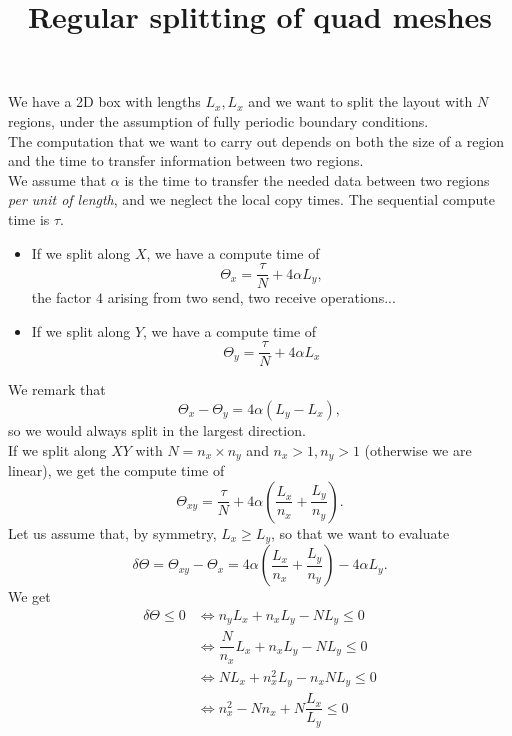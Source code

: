 \documentclass[aps]{revtex4}
\begin{document}
\title{Regular splitting of quad meshes}
\maketitle
We have a 2D box with lengths $L_x,L_x$ and
we want to split the layout with $N$ regions, under the assumption
of fully periodic boundary conditions.\\
 The computation
that we want to carry out depends on both the size of
a region and the time to transfer information between two
regions.\\
We assume that $\alpha$ is the time to transfer the needed data 
between two regions \emph{per unit of length}, and
we neglect the local copy times.
The sequential compute time is $\tau$.
\begin{itemize}
\item If we split along $X$, we have a compute time of
\begin{equation}
	\Theta_x = \dfrac{\tau}{N} + 4\alpha L_y,
\end{equation}
the factor $4$ arising from two send, two receive operations...

\item If we split along $Y$, we have a compute time of
\begin{equation}
	\Theta_y = \dfrac{\tau}{N} + 4\alpha L_x
\end{equation}
\end{itemize}

We remark that
\begin{equation}
	\Theta_x - \Theta_y = 4\alpha\left(L_y-L_x\right),
\end{equation}
so we would always split in the largest direction.\\


If we split along $XY$ with $N=n_x \times n_y$ and $n_x>1,n_y>1$ (otherwise we are linear),
we get the compute time of
\begin{equation}
	\Theta_{xy} = \dfrac{\tau}{N} + 4\alpha\left(\dfrac{L_x}{n_x}+\dfrac{L_y}{n_y}\right).
\end{equation}
Let us assume that, by symmetry, $L_x\geq L_y$, so that we want to evaluate
\begin{equation}
	\delta \Theta = \Theta_{xy}-\Theta_x = 4\alpha\left(\dfrac{L_x}{n_x}+\dfrac{L_y}{n_y}\right) -
	4\alpha L_y.
\end{equation}	
We get
\begin{align}
	\delta \Theta \leq 0 & \Leftrightarrow n_yL_x + n_xL_y - N L_y \leq 0 \\
	& \Leftrightarrow \dfrac{N}{n_x} L_x + n_x L_y - N L_y \leq 0\\
	& \Leftrightarrow N L_x + n_x^2 L_y - n_x N L_y \leq 0\\
	& \Leftrightarrow n_x^2 - N n_x + N \dfrac{L_x}{L_y} \leq 0
\end{align}
\end{document}

